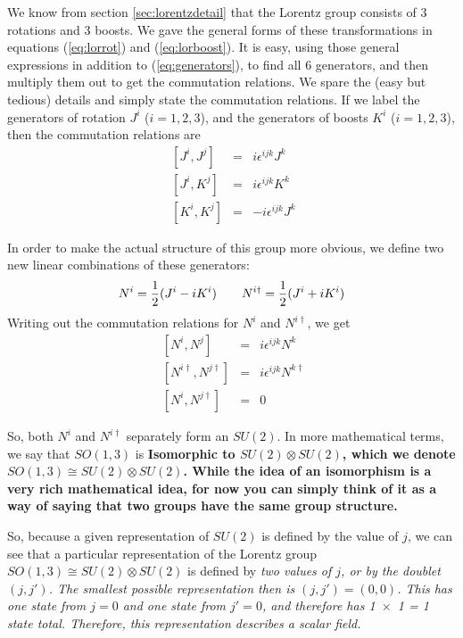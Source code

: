 \documentclass[12pt,epsf]{article}
\def\nolabel{\nonumber }
\def\nolabel{\nonumber }
\begin{document}
We know from section \ref{sec:lorentzdetail} that the Lorentz group
consists of 3 rotations and 3 boosts.  We gave the general forms of
these transformations in equations (\ref{eq:lorrot}) and
(\ref{eq:lorboost}).  It is easy, using those general expressions in
addition to (\ref{eq:generators}), to find all 6 generators, and then
multiply them out to get the commutation relations.  We spare the (easy
but tedious) details and simply state the commutation relations.  If we
label the generators of rotation $J^i$ ($i=1,2,3$), and the generators
of boosts $K^i$ ($i=1,2,3$), then the commutation relations are 
\begin{eqnarray}
\;[J^i,J^j] &=& i\epsilon^{ijk}J^k \nolabel\\
\;[J^i,K^j] &=& i\epsilon^{ijk}K^k \nolabel\\
\;[K^i,K^j] &=& -i\epsilon^{ijk}J^k\nolabel
\end{eqnarray}

In order to make the actual structure of this group more obvious, we
define two new linear combinations of these generators:
\begin{eqnarray}
N^i = {1\over 2}(J^i - i K^i) \qquad N^{i\dagger} = {1\over
2}(J^i+iK^i)\nolabel
\end{eqnarray}
Writing out the commutation relations for $N^i$ and $N^{i\dagger}$, we
get
\begin{eqnarray}
\;[N^i,N^j] &=& i\epsilon^{ijk}N^k \nolabel\\
\;[N^{i\dagger},N^{j\dagger}] &=& i\epsilon^{ijk}N^{k\dagger}
\nolabel\\
\;[N^i,N^{j\dagger}] &=& 0\nolabel
\end{eqnarray}

So, both $N^i$ and $N^{i\dagger}$ separately form an $SU(2)$.  In more
mathematical terms, we say that $SO(1,3)$ is \bf Isomorphic \rm to
$SU(2)\otimes SU(2)$, which we denote $SO(1,3)\cong SU(2)\otimes
SU(2)$.  While the idea of an isomorphism is a very rich mathematical
idea, for now you can simply think of it as a way of saying that two
groups have the same group structure.  

So, because a given representation of $SU(2)$ is defined by the value
of $j$, we can see that a particular representation of the Lorentz
group $SO(1,3)\cong SU(2)\otimes SU(2)$ is defined by \it two \rm
values of $j$, or by the doublet $(j,j')$.  The smallest possible
representation then is $(j,j') = (0,0)$.  This has one state from $j=0$
and one state from $j'=0$, and therefore has 1~$\times$~1 = 1 state
total.	Therefore, this representation describes a scalar field.  
\end{document}
